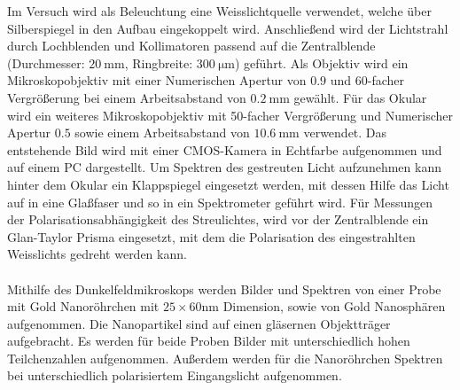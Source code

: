 Im Versuch wird als Beleuchtung eine Weisslichtquelle verwendet, welche über Silberspiegel in den Aufbau eingekoppelt wird. Anschließend wird der Lichtstrahl durch Lochblenden und Kollimatoren passend auf die Zentralblende (Durchmesser: $\SI{20}{\milli\meter}$, Ringbreite: $\SI{300}{\micro\meter}$) geführt. Als Objektiv wird ein Mikroskopobjektiv mit einer Numerischen Apertur von $0.9$ und 60-facher Vergrößerung bei einem Arbeitsabstand von $\SI{0.2}{\milli\meter}$ gewählt. Für das Okular wird ein weiteres Mikroskopobjektiv mit 50-facher Vergrößerung und Numerischer Apertur $0.5$ sowie einem Arbeitsabstand von $\SI{10.6}{\milli\meter}$ verwendet. Das entstehende Bild wird mit einer CMOS-Kamera in Echtfarbe aufgenommen und auf einem PC dargestellt. Um Spektren des gestreuten Licht aufzunehmen kann hinter dem Okular ein Klappspiegel eingesetzt werden, mit dessen Hilfe das Licht auf in eine Glaßfaser und so in ein Spektrometer geführt wird. Für Messungen der Polarisationsabhängigkeit des Streulichtes, wird vor der Zentralblende ein Glan-Taylor Prisma eingesetzt, mit dem die Polarisation des eingestrahlten Weisslichts gedreht werden kann.\\
\\
Mithilfe des Dunkelfeldmikroskops werden Bilder und Spektren von einer Probe mit Gold Nanoröhrchen mit $25\times60 \si{\nano\meter}$ Dimension, sowie von Gold Nanosphären aufgenommen. Die Nanopartikel sind auf einen gläsernen Objektträger aufgebracht. Es werden für beide Proben Bilder mit unterschiedlich hohen Teilchenzahlen aufgenommen. Außerdem werden für die Nanoröhrchen Spektren bei unterschiedlich polarisiertem Eingangslicht aufgenommen. \cite{anleitung}
%
%
